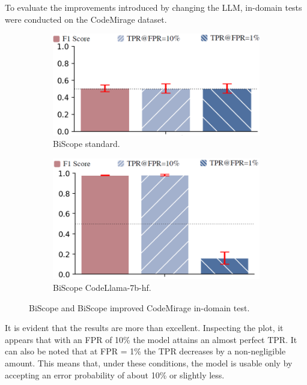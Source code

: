 To evaluate the improvements introduced by changing the LLM, in-domain 
tests were conducted on the CodeMirage dataset.
\begin{figure}[H]
    \centering
    \begin{subfigure}[b]{0.45\textwidth}
        \centering
        \includegraphics[width=\linewidth]{img/BiScope/standard/CodemirageOverCodemirage.png}
        \caption{BiScope standard.}
        \label{fig:BiScope standard.}
    \end{subfigure}
    \hfill
    \begin{subfigure}[b]{0.45\textwidth}
        \centering
        \includegraphics[width=\linewidth]{img/BiScope/test_noramle_migliorato.png}
        \caption{BiScope CodeLlama-7b-hf.}
        \label{fig:BiScope CodeLlama-7b-hf.}
    \end{subfigure}
    \caption{BiScope and BiScope improved CodeMirage in-domain test.}
    \label{fig:BiScope and BiScope improved CodeMirage in-domain test.}
\end{figure}

It is evident that the results are more than excellent. Inspecting the plot, 
it appears that with an FPR of 10\% the model attains an almost perfect TPR. 
It can also be noted that at FPR = 1\% the TPR decreases by a non-negligible 
amount. This means that, under these conditions, the model is usable only by 
accepting an error probability of about 10\% or slightly less.

